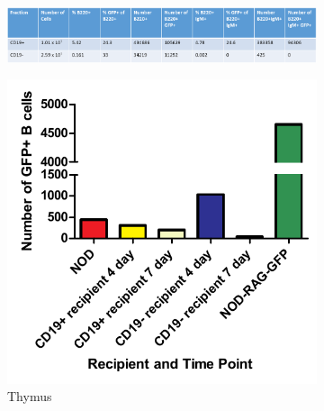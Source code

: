 
\begin{figure}
	\begin{subfigure}{\textwidth}
	\includegraphics[width=\textwidth]{Figures/GFPdonortable.png}
	\end{subfigure}
\end{figure}

\begin{figure}
	\begin{subfigure}{0.45\textwidth}
	\includegraphics[width=\textwidth]{Figures/ThyGFPBcells.pdf}
	\caption{Thymus}
	\label{subfig:ThyGFPBcells}
	\end{subfigure}
	\begin{subfigure}{0.45\textwidth}

\end{subfigure}
\end{figure}
